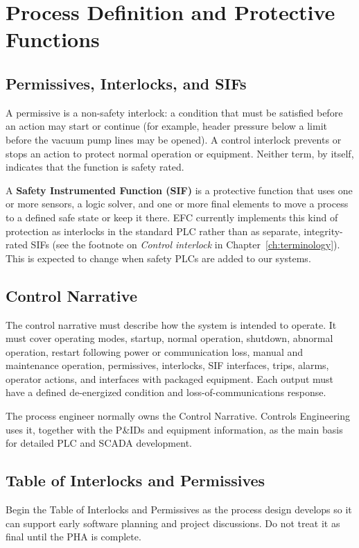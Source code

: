 \chapter{Process Definition and Protective Functions}\label{ch:process-definition}
\section{Permissives, Interlocks, and SIFs}\label{sec:permissives-interlocks}
A permissive is a non-safety interlock: a condition that must be satisfied before an action may start or continue (for example, header pressure below a limit before the vacuum pump lines may be opened). A control interlock prevents or stops an action to protect normal operation or equipment. Neither term, by itself, indicates that the function is safety rated.

A \textbf{Safety Instrumented Function (SIF)} is a protective function that uses one or more sensors, a logic solver, and one or more final elements to move a process to a defined safe state or keep it there. EFC currently implements this kind of protection as interlocks in the standard PLC rather than as separate, integrity-rated SIFs (see the footnote on \emph{Control interlock} in Chapter~\ref{ch:terminology}). This is expected to change when safety PLCs are added to our systems.

\section{Control Narrative}
The control narrative must describe how the system is intended to operate. It must cover operating modes, startup, normal operation, shutdown, abnormal operation, restart following power or communication loss, manual and maintenance operation, permissives, interlocks, SIF interfaces, trips, alarms, operator actions, and interfaces with packaged equipment. Each output must have a defined de-energized condition and loss-of-communications response.

The process engineer normally owns the Control Narrative. Controls Engineering uses it, together with the P\&IDs and equipment information, as the main basis for detailed PLC and SCADA development.

\section{Table of Interlocks and Permissives}
Begin the Table of Interlocks and Permissives as the process design develops so it can support early software planning and project discussions. Do not treat it as final until the PHA is complete.

